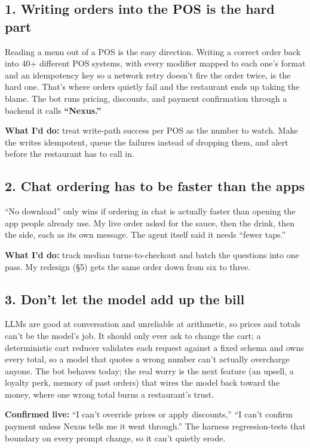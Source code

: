 \documentclass[11pt]{article}
\begin{document}
\subsection*{1. Writing orders into the POS is the hard part}
Reading a menu out of a POS is the easy direction. Writing a correct order back into 40+ different
POS systems, with every modifier mapped to each one's format and an idempotency key so a network
retry doesn't fire the order twice, is the hard one. That's where orders quietly fail and the
restaurant ends up taking the blame. The bot runs pricing, discounts, and payment confirmation
through a backend it calls \textbf{``Nexus.''}
\begin{fixbox}\textbf{What I'd do:} treat write-path success per POS as the number to watch. Make the writes
idempotent, queue the failures instead of dropping them, and alert before the restaurant has to call
in.\end{fixbox}

\subsection*{2. Chat ordering has to be faster than the apps}
``No download'' only wins if ordering in chat is actually faster than opening the app people already
use. My live order asked for the sauce, then the drink, then the side, each as its own message. The
agent itself said it needs ``fewer taps.''
\begin{fixbox}\textbf{What I'd do:} track median turns-to-checkout and batch the questions into one pass. My
redesign (\S5) gets the same order down from six to three.\end{fixbox}

\subsection*{3. Don't let the model add up the bill}
LLMs are good at conversation and unreliable at arithmetic, so prices and totals can't be the model's
job. It should only ever ask to change the cart; a deterministic cart reducer validates each request
against a fixed schema and owns every total, so a model that quotes a wrong number can't actually
overcharge anyone. The bot behaves today; the real worry is the next feature (an upsell, a loyalty
perk, memory of past orders) that wires the model back toward the money, where one wrong total burns a
restaurant's trust.
\begin{fixbox}\textbf{Confirmed live:} ``I can't override prices or apply discounts,'' ``I can't
confirm payment unless Nexus tells me it went through.'' The harness regression-tests that boundary on
every prompt change, so it can't quietly erode.\end{fixbox}
\end{document}
